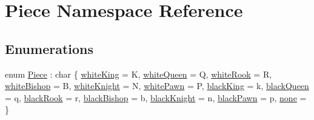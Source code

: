 \hypertarget{namespacePiece}{}\section{Piece Namespace Reference}
\label{namespacePiece}
\subsection*{Enumerations}
\begin{DoxyCompactItemize}
\item 
enum \hyperlink{namespacePiece_a588233307aa6bdb32c1d62c9f20895cc}{Piece} \+: char \{ \newline
\hyperlink{namespacePiece_a588233307aa6bdb32c1d62c9f20895cca2413b8a3f7cbb59125d05af815d19214}{white\+King} = \textquotesingle{}K\textquotesingle{}, 
\hyperlink{namespacePiece_a588233307aa6bdb32c1d62c9f20895cca44ed6948de9734e4bd12bb96c0427b88}{white\+Queen} = \textquotesingle{}Q\textquotesingle{}, 
\hyperlink{namespacePiece_a588233307aa6bdb32c1d62c9f20895cca75b73b8c2f4b1d4ce1cb480615e6690e}{white\+Rook} = \textquotesingle{}R\textquotesingle{}, 
\hyperlink{namespacePiece_a588233307aa6bdb32c1d62c9f20895cca2b4899b0787cd23d26e8bf347514bdad}{white\+Bishop} = \textquotesingle{}B\textquotesingle{}, 
\newline
\hyperlink{namespacePiece_a588233307aa6bdb32c1d62c9f20895cca90a2215b75839cca5eb08277fe4c3e1f}{white\+Knight} = \textquotesingle{}N\textquotesingle{}, 
\hyperlink{namespacePiece_a588233307aa6bdb32c1d62c9f20895cca79f8da67447a78c648d3f246338d58e1}{white\+Pawn} = \textquotesingle{}P\textquotesingle{}, 
\hyperlink{namespacePiece_a588233307aa6bdb32c1d62c9f20895cca8fd6b39fd07d6f6d313c6c37e8986596}{black\+King} = \textquotesingle{}k\textquotesingle{}, 
\hyperlink{namespacePiece_a588233307aa6bdb32c1d62c9f20895cca147d5bd99f9c8b1f736a7ffd9af83f09}{black\+Queen} = \textquotesingle{}q\textquotesingle{}, 
\newline
\hyperlink{namespacePiece_a588233307aa6bdb32c1d62c9f20895cca1da0d86bf116e4c986675fcace583f13}{black\+Rook} = \textquotesingle{}r\textquotesingle{}, 
\hyperlink{namespacePiece_a588233307aa6bdb32c1d62c9f20895cca5e396d34f6422c8b44144ec6c3a95bd2}{black\+Bishop} = \textquotesingle{}b\textquotesingle{}, 
\hyperlink{namespacePiece_a588233307aa6bdb32c1d62c9f20895cca79be088eed40853bcfcd8004e147a5d3}{black\+Knight} = \textquotesingle{}n\textquotesingle{}, 
\hyperlink{namespacePiece_a588233307aa6bdb32c1d62c9f20895cca81afc92740074cc0028b5194899ec606}{black\+Pawn} = \textquotesingle{}p\textquotesingle{}, 
\newline
\hyperlink{namespacePiece_a588233307aa6bdb32c1d62c9f20895cca53f5aebe32a34b7d227e2e03da088831}{none} = \textquotesingle{} \textquotesingle{}
 \}
\end{DoxyCompactItemize}
